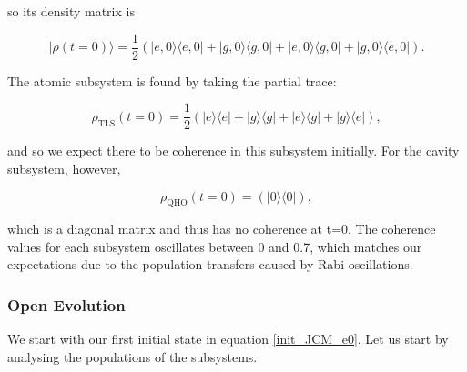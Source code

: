 \documentclass[12pt]{article}
\begin{document}
so its density matrix is

\begin{equation*}
    |\rho(t=0)\rangle = \frac{1}{2}\left(|e,0\rangle\langle e,0| + |g,0\rangle\langle g,0| + |e,0\rangle\langle g,0| + |g,0\rangle\langle e,0| \right).
\end{equation*}

The atomic subsystem is found by taking the partial trace:

\begin{equation*}
    \rho_{\scriptscriptstyle \text{TLS}}(t = 0) = \frac{1}{2}\left(|e\rangle\langle e|+ |g\rangle\langle g|+|e\rangle\langle g|+|g\rangle\langle e|\right),
\end{equation*}

and so we expect there to be coherence in this subsystem initially. For the cavity subsystem, however, 

\begin{equation*}
    \rho_{\scriptscriptstyle \text{QHO}}(t = 0) = \left(|0\rangle\langle 0|\right),
\end{equation*}

which is a diagonal matrix and thus has no coherence at t=0. The coherence values for each subsystem oscillates between 0 and 0.7, which matches our expectations due to the population transfers caused by Rabi oscillations. 




\newpage
\subsubsection{Open Evolution}

We start with our first initial state in equation \eqref{init_JCM_e0}. Let us start by analysing the populations of the subsystems. 
\end{document}
